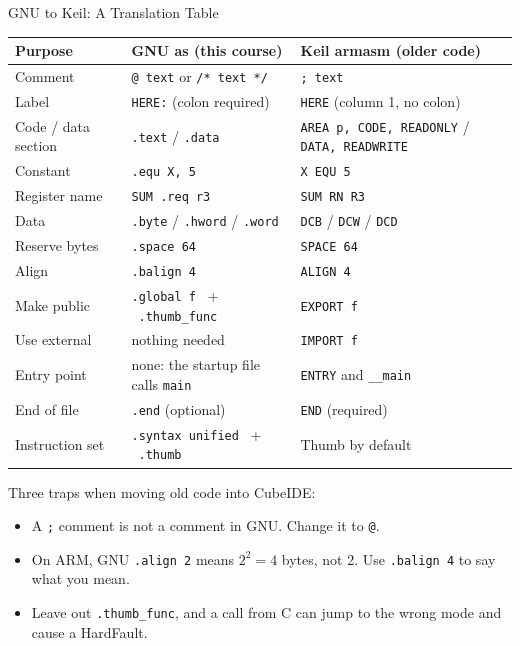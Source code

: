 \documentclass[9pt,aspectratio=169,xcolor=table]{beamer}
\begin{document}
{\beamerextras
\begin{frame}{GNU to Keil: A Translation Table}
    \begin{center}
    {\footnotesize
    \striped
    \begin{tabular}{@{}l l l@{}}
        \toprule
        \textbf{Purpose} & \textbf{GNU as (this course)} & \textbf{Keil armasm (older code)} \\
        \midrule
        Comment          & \texttt{@ text} \quad or \quad \texttt{/* text */} & \texttt{; text} \\
        Label            & \texttt{HERE:} \quad (colon required) & \texttt{HERE} \quad (column 1, no colon) \\
        Code / data section & \texttt{.text} / \texttt{.data} & \texttt{AREA p, CODE, READONLY} / \texttt{DATA, READWRITE} \\
        Constant         & \texttt{.equ X, 5}                 & \texttt{X EQU 5} \\
        Register name    & \texttt{SUM .req r3}               & \texttt{SUM RN R3} \\
        Data             & \texttt{.byte} / \texttt{.hword} / \texttt{.word} & \texttt{DCB} / \texttt{DCW} / \texttt{DCD} \\
        Reserve bytes    & \texttt{.space 64}                 & \texttt{SPACE 64} \\
        Align            & \texttt{.balign 4}                 & \texttt{ALIGN 4} \\
        Make public      & \texttt{.global f} \ + \ \texttt{.thumb\_func} & \texttt{EXPORT f} \\
        Use external     & nothing needed                     & \texttt{IMPORT f} \\
        Entry point      & none: the startup file calls \texttt{main} & \texttt{ENTRY} and \texttt{\_\_main} \\
        End of file      & \texttt{.end} \quad (optional)     & \texttt{END} \quad (required) \\
        Instruction set  & \texttt{.syntax unified} \ + \ \texttt{.thumb} & Thumb by default \\
        \bottomrule
    \end{tabular}}
    \end{center}

    \vspace{1mm}
    {\small Three traps when moving old code into CubeIDE:
    \begin{itemize}\itemsep0pt
        \item A \texttt{;} comment is not a comment in GNU. Change it to \texttt{@}.
        \item On ARM, GNU \texttt{.align 2} means $2^2 = 4$ bytes, not 2. Use \texttt{.balign 4} to say what you mean.
        \item Leave out \texttt{.thumb\_func}, and a call from C can jump to the wrong mode and cause a HardFault.
    \end{itemize}}
\end{frame}
}
\end{document}
